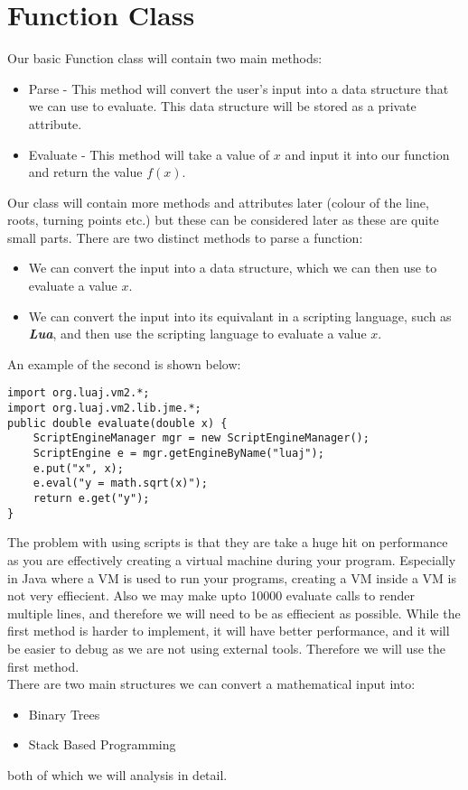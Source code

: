 \documentclass[../../../../main.tex]{subfiles}
\begin{document}
\section{Function Class}	\label{funcClass}
Our basic Function class will contain two main methods:
\begin{itemize}
	\item Parse - This method will convert the user's input into a data structure that we can use to evaluate. This data structure will be stored as a private attribute.
	\item Evaluate - This method will take a value of $x$ and input it into our function and return the value $f(x)$.
\end{itemize}
Our class will contain more methods and attributes later (colour of the line, roots, turning points etc.) but these can be considered later as these are quite small parts. There are two distinct methods to parse a function:
\begin{itemize}
	\item We can convert the input into a data structure, which we can then use to evaluate a value $x$.
	\item We can convert the input into its equivalant in a scripting language, such as \textit{\textbf{Lua}}, and then use the scripting language to evaluate a value $x$.
\end{itemize}
An example of the second is shown below:
\begin{verbatim}
import org.luaj.vm2.*;
import org.luaj.vm2.lib.jme.*;
public double evaluate(double x) {
	ScriptEngineManager mgr = new ScriptEngineManager();
	ScriptEngine e = mgr.getEngineByName("luaj");
	e.put("x", x);
	e.eval("y = math.sqrt(x)");
	return e.get("y");	
}
\end{verbatim}
The problem with using scripts is that they are take a huge hit on performance as you are effectively creating a virtual machine during your program. Especially in Java where a VM is used to run your programs, creating a VM inside a VM is not very effiecient. Also we may make upto 10000 evaluate calls to render multiple lines, and therefore we will need to be as effiecient as possible. While the first method is harder to implement, it will have better performance, and it will be easier to debug as we are not using external tools. Therefore we will use the first method.\\
There are two main structures we can convert a mathematical input into:
\begin{itemize}
	\item Binary Trees
	\item Stack Based Programming
\end{itemize}
both of which we will analysis in detail.
\newpage
\end{document}
